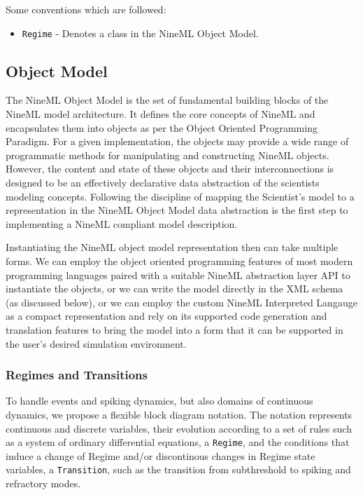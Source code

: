 \documentclass[a4paper]{article}
\newcommand\nmlClass[1]{{\tt #1}}
\begin{document}
Some conventions which are followed: 

\begin{itemize}
\item \nmlClass{Regime} - Denotes a class in the NineML Object Model.
 
\end{itemize}

\subsection{Object Model}

The NineML Object Model is the set of fundamental building blocks of
the NineML model architecture.  It defines the core concepts of NineML
and encapsulates them into objects as per the Object Oriented
Programming Paradigm.  For a given implementation, the objects may
provide a wide range of programmatic methods for manipulating and
constructing NineML objects.  However, the content and state of these
objects and their interconnections is designed to be an effectively
declarative data abstraction of the scientists modeling concepts.
Following the discipline of mapping the Scientist's model to a
representation in the NineML Object Model data abstraction is the
first step to implementing a NineML compliant model description.

Instantiating the NineML object model representation then can take
multiple forms.  We can employ the object oriented programming
features of most modern programming languages paired with a suitable
NineML abstraction layer API to instantiate the objects, or we can
write the model directly in the XML schema (as discussed below), or we
can employ the custom NineML Interpreted Langauge as a compact
representation and rely on its supported code generation and
translation features to bring the model into a form that it can be
supported in the user's desired simulation environment.

\subsubsection{Regimes and Transitions}

To handle events and spiking dynamics, but also domains of continuous
dynamics, we propose a flexible block diagram notation.  The notation
represents continuous and discrete variables, their evolution
according to a set of rules such as a system of ordinary differential
equations, a \nmlClass{Regime}, and the conditions that induce a change of
Regime and/or discontinous changes in Regime state variables, a
\nmlClass{Transition}, such as the transition from subthreshold to spiking
and refractory modes.
\end{document}
